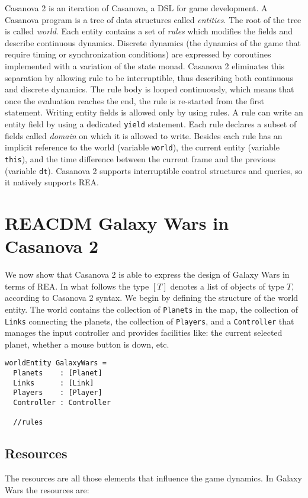 Casanova 2 is an iteration of Casanova, a DSL for game development. A Casanova program is a tree of data structures called \textit{entities}. The root of the tree is called \textit{world}. Each entity contains a set of \textit{rules} which modifies the fields and describe continuous dynamics. Discrete dynamics (the dynamics of the game that require timing or synchronization conditions) are expressed by coroutines implemented with a variation of the state monad. Casanova 2 eliminates this separation by allowing rule to be interruptible, thus describing both continuous and discrete dynamics. The rule body is looped continuously, which means that once the evaluation reaches the end, the rule is re-started from the first statement. Writing entity fields is allowed only by using rules. A rule can write an entity field by using a dedicated \texttt{yield} statement. Each rule declares a subset of fields called \textit{domain} on which it is allowed to write. Besides each rule has an implicit reference to the world (variable \texttt{world}), the current entity (variable \texttt{this}), and the time difference between the current frame and the previous (variable \texttt{dt}). Casanova 2 supports interruptible control structures and queries, so it natively supports REA.

\section{REACDM Galaxy Wars in Casanova 2}
We now show that Casanova 2 is able to express the design of Galaxy Wars in terms of REA. In what follows the type $[T]$ denotes a list of objects of type $T$, according to Casanova 2 syntax. We begin by defining the structure of the world entity. The world contains the collection of \texttt{Planets} in the map, the collection of \texttt{Links} connecting the planets, the collection of \texttt{Players}, and a \texttt{Controller} that manages the input controller and provides facilities like: the current selected planet, whether a mouse button is down, etc.

\begin{lstlisting}
worldEntity GalaxyWars =
  Planets    : [Planet]
  Links      : [Link]
  Players    : [Player]
  Controller : Controller 
  
  //rules
\end{lstlisting}



\subsection{Resources}
The resources are all those elements that influence the game dynamics. In Galaxy Wars the resources are: 


